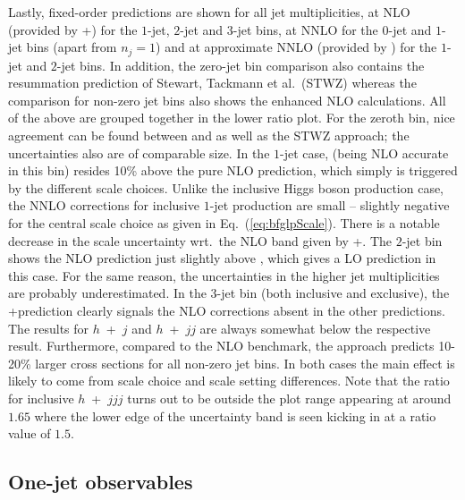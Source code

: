 Lastly, fixed-order predictions are shown for all jet multiplicities,
at NLO (provided by \GoSam+\Sherpa) for the $1$-jet, $2$-jet and
$3$-jet bins, at NNLO for the $0$-jet and $1$-jet bins (apart from
$n_j=1$) and at approximate NNLO (provided by \Loopsim) for the
$1$-jet and $2$-jet bins. In addition, the zero-jet bin comparison
also contains the resummation prediction of Stewart, Tackmann et
al.~(\textsc{STWZ}) whereas the comparison for non-zero jet bins also
shows the \Minlo enhanced NLO calculations. All of the above are
grouped together in the lower ratio plot. For the zeroth bin, nice
agreement can be found between \Powheg and \Sherpa \NNLOPS as well as
the \textsc{STWZ} approach; the uncertainties also are of comparable
size. In the $1$-jet case, \Powheg (being NLO accurate in this bin)
resides 10\% above the pure NLO prediction, which simply is triggered
by the different scale choices. Unlike the inclusive Higgs boson
production case, the NNLO corrections for inclusive $1$-jet production
are small -- slightly negative for the central scale choice as given
in Eq.~(\ref{eq:bfglpScale}). There is a notable decrease in the scale
uncertainty wrt.~the NLO band given by \GoSam+\Sherpa. The $2$-jet bin
shows the \GoSam NLO prediction just slightly above \Powheg, which
gives a LO prediction in this case. For the same reason, the \Powheg
uncertainties in the higher jet multiplicities are probably
underestimated. In the $3$-jet bin (both inclusive and exclusive), the
\GoSam+\Sherpa prediction clearly signals the NLO corrections absent
in the other predictions. The \Loopsim results for $h$~+~$j$ and
$h$~+~$jj$ are always somewhat below the respective \GoSam result.
Furthermore, compared to the NLO benchmark, the \Minlo approach
predicts 10-20\% larger cross sections for all non-zero jet bins. In
both cases the main effect is likely to come from scale choice and
scale setting differences. Note that the \Minlo ratio for inclusive
$h$~+~$jjj$ turns out to be outside the plot range appearing at around
$1.65$ where the lower edge of the uncertainty band is seen kicking in
at a ratio value of $1.5$.



\subsection{One-jet observables}
\label{sec:hjetscomp:results:1jobs}

